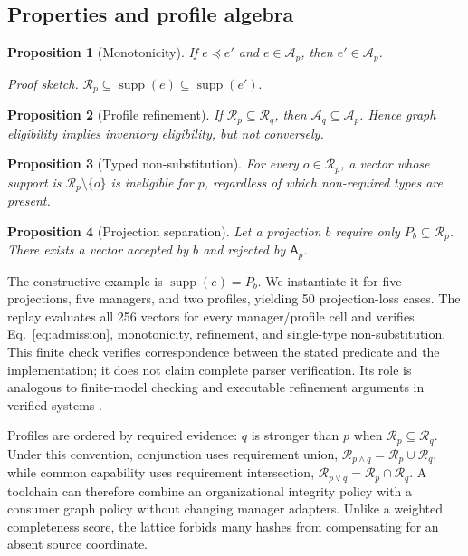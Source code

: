 \documentclass[10pt,conference]{IEEEtran}
\newtheorem{proposition}{Proposition}
\newcommand{\Req}{\mathcal{R}}
\newcommand{\Adm}{\mathcal{A}}
\newcommand{\supp}{\operatorname{supp}}
\newcommand{\admit}{\mathsf{A}}
\begin{document}
\subsection{Properties and profile algebra}
\begin{proposition}[Monotonicity]
If $e\preceq e'$ and $e\in\Adm_p$, then $e'\in\Adm_p$.
\end{proposition}
\emph{Proof sketch.} $\Req_p\subseteq\supp(e)\subseteq\supp(e')$.

\begin{proposition}[Profile refinement]
If $\Req_p\subseteq\Req_q$, then $\Adm_q\subseteq\Adm_p$. Hence graph eligibility implies inventory eligibility, but not conversely.
\end{proposition}

\begin{proposition}[Typed non-substitution]
For every $o\in\Req_p$, a vector whose support is $\Req_p\setminus\{o\}$ is ineligible for $p$, regardless of which non-required types are present.
\end{proposition}

\begin{proposition}[Projection separation]
Let a projection $b$ require only $P_b\subsetneq\Req_p$. There exists a vector accepted by $b$ and rejected by $\admit_p$.
\end{proposition}
The constructive example is $\supp(e)=P_b$. We instantiate it for five projections, five managers, and two profiles, yielding 50 projection-loss cases. The replay evaluates all 256 vectors for every manager/profile cell and verifies Eq.~\ref{eq:admission}, monotonicity, refinement, and single-type non-substitution. This finite check verifies correspondence between the stated predicate and the implementation; it does not claim complete parser verification. Its role is analogous to finite-model checking \cite{holzmann1997model,clarke1999model} and executable refinement arguments in verified systems \cite{leroy2009formal,klein2009sel4}.

Profiles are ordered by required evidence: $q$ is stronger than $p$ when $\Req_p\subseteq\Req_q$. Under this convention, conjunction uses requirement union, $\Req_{p\wedge q}=\Req_p\cup\Req_q$, while common capability uses requirement intersection, $\Req_{p\vee q}=\Req_p\cap\Req_q$. A toolchain can therefore combine an organizational integrity policy with a consumer graph policy without changing manager adapters. Unlike a weighted completeness score, the lattice forbids many hashes from compensating for an absent source coordinate.
\end{document}
